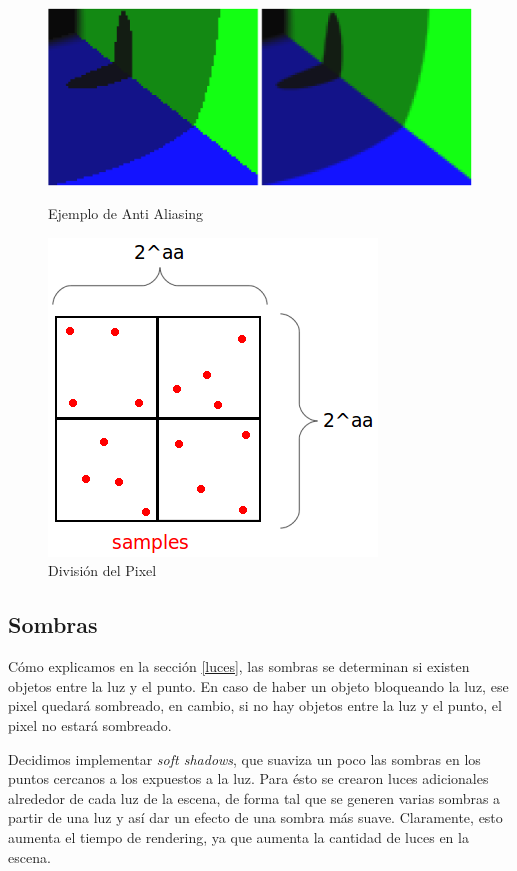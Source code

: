 \documentclass[a4paper,10pt]{article}
\begin{document}
\begin{figure}[ht]
\begin{minipage}[b]{0.5\linewidth}
\centering
\includegraphics[scale=0.23]{aa_muestra.png}
\caption{Ejemplo de Anti Aliasing}
\label{fig:figure7}
\end{minipage}
\hspace{0.5cm}
\begin{minipage}[b]{0.5\linewidth}
\centering
\includegraphics[scale=0.40]{aa_samples.png}
\caption{Divisi\'on del Pixel}
\label{fig:figure8}
\end{minipage}
\end{figure}

\subsection{Sombras}

C\'omo explicamos en la secci\'on \ref{luces}, las sombras se determinan si
existen objetos entre la luz y el punto.  En caso de haber un objeto bloqueando
la luz, ese pixel quedar\'a sombreado, en cambio, si no hay objetos entre la
luz y el punto, el pixel no estar\'a sombreado.

Decidimos implementar \emph{soft shadows}, que suaviza un poco las sombras en
los puntos cercanos a los expuestos a la luz. Para \'esto se crearon luces adicionales
alrededor de cada luz de la escena, de forma tal que se generen varias sombras a
partir de una luz y as\'i dar un efecto de una sombra m\'as suave. Claramente, 
esto aumenta el tiempo de rendering, ya que aumenta la cantidad de luces en
la escena.
\end{document}

